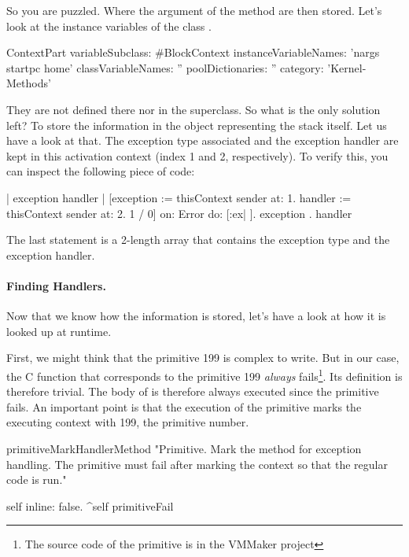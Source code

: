 \documentclass[a4paper,10pt,twoside]{book}
\begin{document}
So you are puzzled. Where the argument of the  method are then stored. Let's look at the instance variables of the class . 

\begin{code}{}
ContextPart variableSubclass: #BlockContext
	instanceVariableNames: 'nargs startpc home'
	classVariableNames: ''
	poolDictionaries: ''
	category: 'Kernel-Methods'
\end{code}

They are not defined there nor in the superclass. So what is the only solution left? To store the information in the object representing the stack itself. Let us have a look at that. The exception type associated and the exception handler are kept in this activation context (index 1 and 2, respectively). To verify this, you can inspect the following piece of code:


\begin{code}{}
| exception handler | 
[exception := thisContext sender at: 1. 
 handler := thisContext sender at: 2. 
 1 / 0] 
on: Error 
do: [:ex| ]. 
{ exception . handler } 
\end{code}

The last statement is a 2-length array that contains the exception type and the exception handler. 



\paragraph{Finding Handlers.}
Now that we know how the information is stored, let's have a look at how it is looked up at runtime. 

First, we might think that the primitive 199 is complex to write. But in our case, the C function that corresponds to the primitive 199 \emph{always} fails\footnote{The source code of the primitive is  in the VMMaker \sqsrc project}. Its definition is therefore trivial. The body of  is therefore always executed since the primitive fails. An important point is that the execution of the primitive marks the executing context with 199, the primitive number. 

\begin{code}{}
primitiveMarkHandlerMethod
     "Primitive. Mark the method for exception handling. The primitive must fail after marking the 
     context so that the regular code is run."
     
     self inline: false.
    ^self primitiveFail
\end{code}
\end{document}
